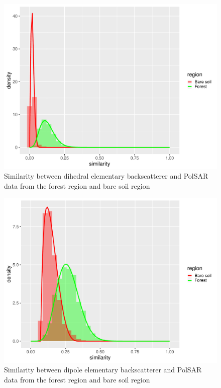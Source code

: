 \documentclass[conference]{IEEEtran}
\begin{document}
\begin{figure}[!ht]
    \centering
    \includegraphics[width = .9\linewidth, height = .7\linewidth]{../../../Figures/paper_19_05/di.pdf}
    \caption{Similarity between dihedral elementary backscatterer and PolSAR data from the forest region and bare soil region}
    \label{fig:di}
\end{figure}

\begin{figure}[!ht]
    \centering
    \includegraphics[width = .9\linewidth, height = .7\linewidth]{../../../Figures/paper_19_05/dip.pdf}
    \caption{Similarity between dipole elementary backscatterer and PolSAR data from the forest region and bare soil region}
    \label{fig:dip}
\end{figure}
\end{document}
